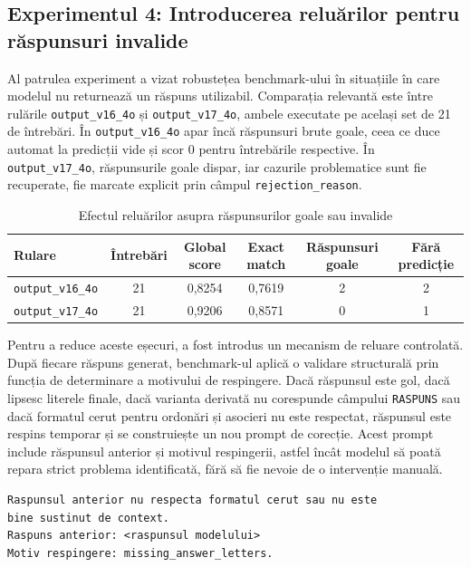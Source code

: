 \documentclass[12pt, a4paper, oneside, romanian]{teza-upb}
\begin{document}
\subsection{Experimentul 4: Introducerea reluărilor pentru răspunsuri invalide}

Al patrulea experiment a vizat robustețea benchmark-ului în situațiile în care modelul nu returnează un răspuns utilizabil. Comparația relevantă este între rulările \texttt{output\_v16\_4o} și \texttt{output\_v17\_4o}, ambele executate pe același set de 21 de întrebări. În \texttt{output\_v16\_4o} apar încă răspunsuri brute goale, ceea ce duce automat la predicții vide și scor 0 pentru întrebările respective. În \texttt{output\_v17\_4o}, răspunsurile goale dispar, iar cazurile problematice sunt fie recuperate, fie marcate explicit prin câmpul \texttt{rejection\_reason}.

\begin{table}[H]
\centering
\caption{Efectul reluărilor asupra răspunsurilor goale sau invalide}
\label{tab:experiment_retry_v16_v17}
\small
\begin{tabular}{lccccc}
\toprule
\textbf{Rulare} & \textbf{Întrebări} & \textbf{Global score} & \textbf{Exact match} & \textbf{Răspunsuri goale} & \textbf{Fără predicție} \\
\midrule
\texttt{output\_v16\_4o} & 21 & 0,8254 & 0,7619 & 2 & 2 \\
\texttt{output\_v17\_4o} & 21 & 0,9206 & 0,8571 & 0 & 1 \\
\bottomrule
\end{tabular}
\end{table}

Pentru a reduce aceste eșecuri, a fost introdus un mecanism de reluare controlată. După fiecare răspuns generat, benchmark-ul aplică o validare structurală prin funcția de determinare a motivului de respingere. Dacă răspunsul este gol, dacă lipsesc literele finale, dacă varianta derivată nu corespunde câmpului \texttt{RASPUNS} sau dacă formatul cerut pentru ordonări și asocieri nu este respectat, răspunsul este respins temporar și se construiește un nou prompt de corecție. Acest prompt include răspunsul anterior și motivul respingerii, astfel încât modelul să poată repara strict problema identificată, fără să fie nevoie de o intervenție manuală.

\begin{lstlisting}[basicstyle=\ttfamily\footnotesize]
Raspunsul anterior nu respecta formatul cerut sau nu este
bine sustinut de context.
Raspuns anterior: <raspunsul modelului>
Motiv respingere: missing_answer_letters.
\end{lstlisting}
\end{document}
